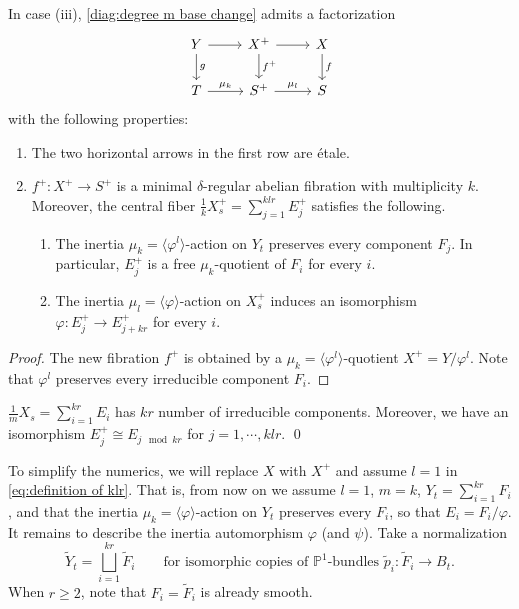 \documentclass[reqno, letterpaper]{amsart}
\numberwithin{equation}{subsection}
\let\to\longrightarrow
\newcommand{\PP}{\mathbb{P}}
\begin{document}
			\begin{lemma}
				In case (iii), \eqref{diag:degree m base change} admits a factorization
				\[\begin{tikzcd}[column sep=normal]
					Y \arrow[r] \arrow[d, "g"] & X^+ \arrow[r] \arrow[d, "f^+"] & X \arrow[d, "f"] \\
					T \arrow[r, "\mu_k"] & S^+ \arrow[r, "\mu_l"] & S
				\end{tikzcd}\]
				with the following properties:
				\begin{enumerate}
					\item The two horizontal arrows in the first row are \'etale.
					\item $f^+ : X^+ \to S^+$ is a minimal $\delta$-regular abelian fibration with multiplicity $k$. Moreover, the central fiber $\frac{1}{k} X_s^+ = \sum_{j=1}^{klr} E_j^+$ satisfies the following.
					\begin{enumerate}
						\item The inertia $\mu_k = \langle \varphi^l \rangle$-action on $Y_t$ preserves every component $F_j$. In particular, $E_j^+$ is a free $\mu_k$-quotient of $F_i$ for every $i$.
						\item The inertia $\mu_l = \langle \varphi \rangle$-action on $X_s^+$ induces an isomorphism $\varphi : E_j^+ \to E_{j + kr}^+$ for every $i$.
					\end{enumerate}
				\end{enumerate}
			\end{lemma}
			\begin{proof}
				The new fibration $f^+$ is obtained by a $\mu_k = \langle \varphi^l \rangle$-quotient $X^+ = Y / \varphi^l$. Note that $\varphi^l$ preserves every irreducible component $F_i$.
			\end{proof}
			
			\begin{corollary}
				$\frac{1}{m} X_s = \sum_{i=1}^{kr} E_i$ has $kr$ number of irreducible components. Moreover, we have an isomorphism $E_j^+ \cong E_{j \mod kr}$ for $j = 1, \cdots, klr$. \qed
			\end{corollary}
			
			To simplify the numerics, we will replace $X$ with $X^+$ and assume $l = 1$ in \eqref{eq:definition of klr}. That is, from now on we assume $l = 1$, $m = k$, $Y_t = \sum_{i=1}^{kr} F_i$, and that the inertia $\mu_k = \langle \varphi \rangle$-action on $Y_t$ preserves every $F_i$, so that $E_i = F_i / \varphi$. It remains to describe the inertia automorphism $\varphi$ (and $\psi$). Take a normalization
			\[ \tilde Y_t = \bigsqcup_{i=1}^{kr} \tilde F_i \qquad\mbox{for isomorphic copies of } \PP^1 \mbox{-bundles } \tilde p_i : \tilde F_i \to B_t .\]
			When $r \ge 2$, note that $F_i = \tilde F_i$ is already smooth.
			
\end{document}
